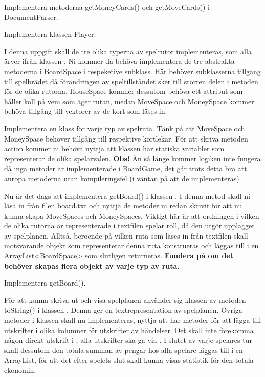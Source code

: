 \Subtask Implementera metoderna getMoneyCards() och getMoveCards() i DocumentParser.

\Subtask Implementera klassen Player.

\Task I denna uppgift skall de tre olika typerna av spelrutor implementeras, som alla ärver ifrån klassen . Ni kommer då behöva implementera de tre abstrakta metoderna i BoardSpace i respeketive subklass. Här behöver subklasserna tillgång till spelbrädet då förändringen av speltillståndet sker till störren delen i metoden  för de olika rutorna. HouseSpace kommer dessutom behöva ett attribut som håller koll på vem som äger rutan, medan MoveSpace och MoneySpace kommer behöva tillgång till vektorer av de kort som läses in.

\Subtask Implementera en klass för varje typ av spelruta. Tänk på att MoveSpace och MoneySpace behöver tillgång till respektive kortlekar.
För att skriva metoden action kommer ni behöva nyttja att klassen  har statiska variabler som representerar de olika spelarvalen.
\newline
\newline
\noindent
\textbf{Obs!} Än så länge kommer logiken inte fungera då inga metoder är implementerade i BoardGame, det går trots detta bra att anropa metoderna utan kompileringsfel (i väntan på att de implementeras).



\Task Nu är det dags att implementera getBoard() i klassen . I denna metod skall ni läsa in från filen board.txt och nyttja de metoder ni redan skrivit för att nu kunna skapa MoveSpaces och MoneySpaces. Viktigt här är att ordningen i vilken de olika rutorna är representerade i textfilen spelar roll, då den utgör upplägget av spelplanen. Alltså, beroende på vilken ruta som läses in från textfilen skall motsvarande objekt som representerar denna ruta konstrueras och läggas till i en ArrayList<BoardSpace> som slutligen returneras.
\textbf{Fundera på om det behöver skapas flera objekt av varje typ av ruta.} 

\Subtask Implementera getBoard().

\Task För att kunna skriva ut och visa spelplanen använder sig klassen   av metoden toString() i klassen . Denna ger en textrepresentation av spelplanen. Övriga metoder i klassen  skall nu implementeras, nyttja att   har metoder för att lägga till utskrifter i olika kolumner för utskrifter av händelser. Det skall inte förekomma någon direkt utskrift i  , alla utskrifter ska gå via . I slutet av varje spelares tur skall dessutom den totala summan av pengar hos alla spelare läggas till i en ArrayList, för att det efter spelets slut skall kunna visas statistik för den totala ekonomin.

